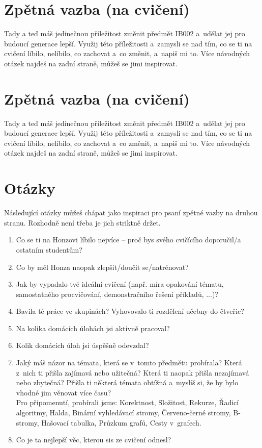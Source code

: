 \documentclass[12pt,a5paper]{article}
\begin{document}
\pagestyle{empty}

\section*{Zpětná vazba (na cvičení)}
Tady a teď máš jedinečnou příležitost změnit předmět IB002 a~udělat jej pro
budoucí generace lepší. Využij této příležitosti a~zamysli se nad tím, co
se ti na cvičení líbilo, nelíbilo, co zachovat a~co změnit, a~napiš mi to.
Více návodných otázek najdeš na zadní straně, můžeš se jimi inspirovat.

\newpage

\section*{Zpětná vazba (na cvičení)}
Tady a teď máš jedinečnou příležitost změnit předmět IB002 a~udělat jej pro
budoucí generace lepší. Využij této příležitosti a~zamysli se nad tím, co
se ti na cvičení líbilo, nelíbilo, co zachovat a~co změnit, a~napiš mi to.
Více návodných otázek najdeš na zadní straně, můžeš se jimi inspirovat.

\newpage

\section*{Otázky}

Následující otázky můžeš chápat jako inspiraci pro psaní zpětné vazby na
druhou stranu. Rozhodně není třeba je jich striktně držet.

\begin{enumerate}
	\item Co se ti na Honzovi líbilo nejvíce – proč bys svého cvičícího
	doporučil/a ostatním studentům?
	\item Co by měl Honza naopak zlepšit/doučit se/natrénovat?
	\item Jak by vypadalo tvé ideální cvičení (např. míra opakování tématu,
		  samostatného procvičování, demonstračního řešení příkladů, ...)?
	\item Bavila tě práce ve skupinách? Vyhovovalo ti rozdělení učebny do
	      čtveřic?
	\item Na kolika domácích úlohách jsi aktivně pracoval?
	\item Kolik domácích úloh jsi úspěšně odevzdal?
	\item Jaký máš názor na témata, která se v~tomto předmětu probírala? Která
	      z~nich ti přišla zajímavá nebo užitečná? Která ti naopak přišla
	      nezajímavá nebo zbytečná? Přišla ti některá témata obtížná a~myslíš si,
	      že by bylo vhodné jim věnovat více času? \\
	      Pro připomenutí, probírali jsme: Korektnost, Složitost, Rekurze,
	      Řadicí algoritmy, Halda, Binární vyhledávací stromy, Červeno-černé
	      stromy, B-stromy, Hašovací tabulka, Průzkum grafů, Cesty v~grafech.
	\item Co je ta nejlepší věc, kterou sis ze cvičení odnesl?
\end{enumerate}
\end{document}
